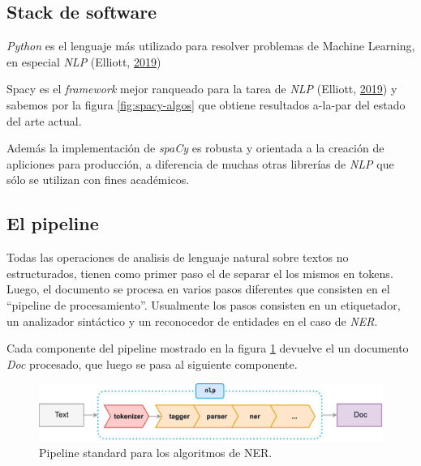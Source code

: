 \documentclass[12pt,a4paper,]{scrartcl}
\begin{document}
\hypertarget{stack-de-software}{%
\subsection{Stack de software}\label{stack-de-software}}

\emph{Python} es el lenguaje más utilizado para resolver problemas de Machine Learning, en especial \emph{NLP} (Elliott, \protect\hyperlink{ref-github_machine_learning}{2019})

Spacy es el \emph{framework} mejor ranqueado para la tarea de \emph{NLP} (Elliott, \protect\hyperlink{ref-github_machine_learning}{2019}) y sabemos por la figura \ref{fig:spacy-algos} que obtiene resultados a-la-par del estado del arte actual.

Además la implementación de \emph{spaCy} es robusta y orientada a la creación de apliciones para producción, a diferencia de muchas otras librerías de \emph{NLP} que sólo se utilizan con fines académicos.

\hypertarget{el-pipeline}{%
\subsection{El pipeline}\label{el-pipeline}}

Todas las operaciones de analisis de lenguaje natural sobre textos no estructurados, tienen como primer paso el de separar el los mismos en tokens. Luego, el documento se procesa en varios pasos diferentes que consisten en el \enquote{pipeline de procesamiento}. Usualmente los pasos consisten en un etiquetador, un analizador sintáctico y un reconocedor de entidades en el caso de \emph{NER}.

Cada componente del pipeline mostrado en la figura \ref{fig:spacy-pipeline} devuelve el un documento \emph{Doc} procesado, que luego se pasa al siguiente componente.

\begin{figure}[H]

{\centering \includegraphics{assets/spacy_pipeline.pdf} 

}

\caption{Pipeline standard para los algoritmos de NER.}\label{fig:spacy-pipeline}
\end{figure}
\end{document}
